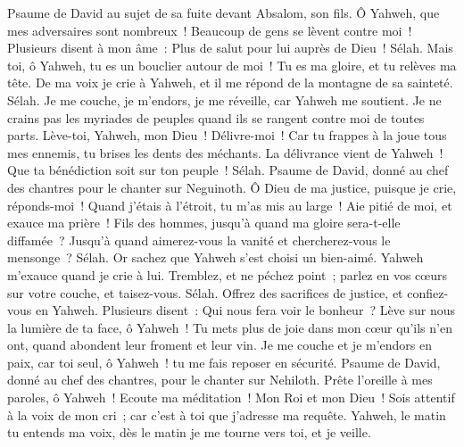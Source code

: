\begin{multicols}{2}
\VerseOne{}Psaume de David au sujet de sa fuite devant Absalom, son fils.
Ô Yahweh, que mes adversaires sont nombreux~! Beaucoup de gens se lèvent contre moi~!
Plusieurs disent à mon âme~: Plus de salut pour lui auprès de Dieu~! Sélah.
Mais toi, ô Yahweh, tu es un bouclier autour de moi~! Tu es ma gloire, et tu relèves ma tête.
De ma voix je crie à Yahweh, et il me répond de la montagne de sa sainteté. Sélah.
Je me couche, je m'endors, je me réveille, car Yahweh me soutient.
Je ne crains pas les myriades de peuples quand ils se rangent contre moi de toutes parts.
Lève-toi, Yahweh, mon Dieu~! Délivre-moi~! Car tu frappes à la joue tous mes ennemis, tu brises les dents des méchants.
La délivrance vient de Yahweh~! Que ta bénédiction soit sur ton peuple~! Sélah.
\VerseOne{}Psaume de David, donné au chef des chantres pour le chanter sur Neguinoth.
Ô Dieu de ma justice, puisque je crie, réponds-moi~! Quand j'étais à l'étroit, tu m'as mis au large~! Aie pitié de moi, et exauce ma prière~!
Fils des hommes, jusqu'à quand ma gloire sera-t-elle diffamée~? Jusqu'à quand aimerez-vous la vanité et chercherez-vous le mensonge~? Sélah.
Or sachez que Yahweh s'est choisi un bien-aimé. Yahweh m'exauce quand je crie à lui.
Tremblez, et ne péchez point~; parlez en vos cœurs sur votre couche, et taisez-vous. Sélah.
Offrez des sacrifices de justice, et confiez-vous en Yahweh.
Plusieurs disent~: Qui nous fera voir le bonheur~? Lève sur nous la lumière de ta face, ô Yahweh~!
Tu mets plus de joie dans mon cœur qu'ils n'en ont, quand abondent leur froment et leur vin.
Je me couche et je m'endors en paix, car toi seul, ô Yahweh~! tu me fais reposer en sécurité.
\VerseOne{}Psaume de David, donné au chef des chantres, pour le chanter sur Nehiloth.
Prête l'oreille à mes paroles, ô Yahweh~! Ecoute ma méditation~!
Mon Roi et mon Dieu~! Sois attentif à la voix de mon cri~; car c’est à toi que j’adresse ma requête.
Yahweh, le matin tu entends ma voix, dès le matin je me tourne vers toi, et je veille.

\end{multicols}
